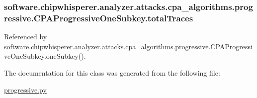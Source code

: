 \subsubsection[{total\+Traces}]{\setlength{\rightskip}{0pt plus 5cm}software.\+chipwhisperer.\+analyzer.\+attacks.\+cpa\+\_\+algorithms.\+progressive.\+C\+P\+A\+Progressive\+One\+Subkey.\+total\+Traces}\label{classsoftware_1_1chipwhisperer_1_1analyzer_1_1attacks_1_1cpa__algorithms_1_1progressive_1_1CPAProgressiveOneSubkey_a07a202a4af63fed2b3d66043eca926b6}


Referenced by software.\+chipwhisperer.\+analyzer.\+attacks.\+cpa\+\_\+algorithms.\+progressive.\+C\+P\+A\+Progressive\+One\+Subkey.\+one\+Subkey().



The documentation for this class was generated from the following file\+:\begin{DoxyCompactItemize}
\item 
\hyperlink{progressive_8py}{progressive.\+py}\end{DoxyCompactItemize}
